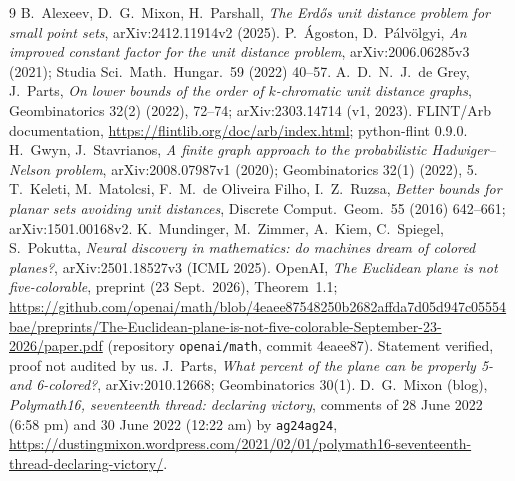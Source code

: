 \documentclass[10pt,a4paper]{article}
\begin{document}
\begin{thebibliography}{9}\small
{} B.~Alexeev, D.~G.~Mixon, H.~Parshall, \emph{The Erd\H{o}s unit distance problem for small
point sets}, arXiv:2412.11914v2 (2025).
 P.~\'Agoston, D.~P\'alv\"olgyi, \emph{An improved constant factor for the unit distance
problem}, arXiv:2006.06285v3 (2021); Studia Sci.\ Math.\ Hungar.\ 59 (2022) 40--57.
 A.~D.~N.~J.~de Grey, J.~Parts, \emph{On lower bounds of the order of $k$-chromatic unit
distance graphs}, Geombinatorics 32(2) (2022), 72--74; arXiv:2303.14714 (v1, 2023).
 FLINT/Arb documentation, \url{https://flintlib.org/doc/arb/index.html}; python-flint 0.9.0.
 H.~Gwyn, J.~Stavrianos, \emph{A finite graph approach to the probabilistic
Hadwiger--Nelson problem}, arXiv:2008.07987v1 (2020); Geombinatorics 32(1) (2022), 5.
 T.~Keleti, M.~Matolcsi, F.~M.~de Oliveira Filho, I.~Z.~Ruzsa, \emph{Better bounds for planar
sets avoiding unit distances}, Discrete Comput.\ Geom.\ 55 (2016) 642--661; arXiv:1501.00168v2.
 K.~Mundinger, M.~Zimmer, A.~Kiem, C.~Spiegel, S.~Pokutta, \emph{Neural discovery in
mathematics: do machines dream of colored planes?}, arXiv:2501.18527v3 (ICML 2025).
 OpenAI, \emph{The Euclidean plane is not five-colorable}, preprint (23 Sept.\ 2026), Theorem~1.1;
\url{https://github.com/openai/math/blob/4eaee87548250b2682affda7d05d947c05554bae/preprints/The-Euclidean-plane-is-not-five-colorable-September-23-2026/paper.pdf}
(repository \texttt{openai/math}, commit 4eaee87). Statement verified, proof not audited by us.
 J.~Parts, \emph{What percent of the plane can be properly 5- and 6-colored?},
arXiv:2010.12668; Geombinatorics 30(1).
 D.~G.~Mixon (blog), \emph{Polymath16, seventeenth thread: declaring victory}, comments of
28 June 2022 (6:58 pm) and 30 June 2022 (12:22 am) by \texttt{ag24ag24},
\url{https://dustingmixon.wordpress.com/2021/02/01/polymath16-seventeenth-thread-declaring-victory/}.
\end{thebibliography}
\end{document}
